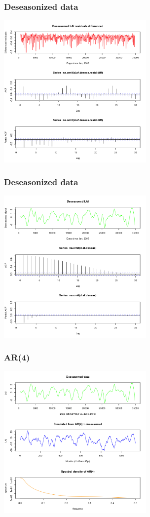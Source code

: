 \documentclass{beamer}
\begin{document}
\begin{frame}
    \frametitle{Deseasonized data}
    \includegraphics[height=3in]{../img/deseasonalization_resid_difference.png}
\end{frame}

\begin{frame}
    \frametitle{Deseasonized data}
    \includegraphics[height=3in]{../img/deseasonalization.png}
\end{frame}

\begin{frame}
    \frametitle{AR(4)}
    \includegraphics[height=3in]{../img/ar_sim.png}
\end{frame}
\end{document}

